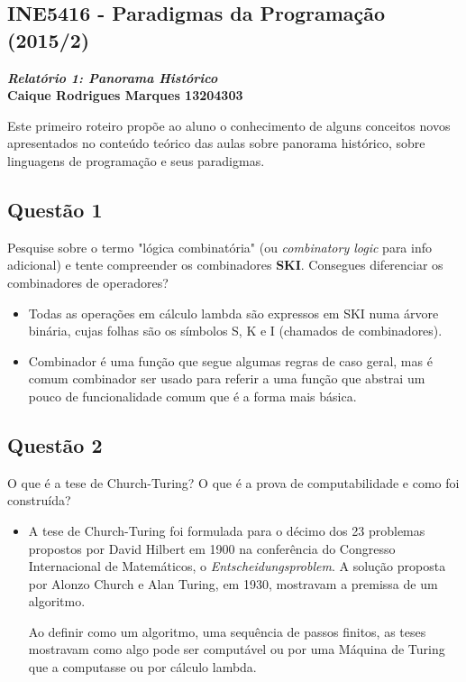 \documentclass{article}
\begin{document}
\begin{center}
    \section*{INE5416 - Paradigmas da Programação (2015/2)}
    \textbf{\textit{Relatório 1: Panorama Histórico} \\
    Caique Rodrigues Marques 13204303}
\end{center}
Este primeiro roteiro propõe ao aluno o conhecimento de alguns conceitos novos apresentados no conteúdo teórico das aulas sobre panorama histórico, sobre linguagens de programação e seus paradigmas.
\subsection*{Questão 1}
Pesquise sobre o termo "lógica combinatória" (ou \textit{combinatory logic} para info adicional) e tente compreender os combinadores \textbf{SKI}. Consegues diferenciar os combinadores de operadores?
        \begin{itemize}
        \item Todas as operações em cálculo lambda são expressos em SKI numa árvore binária, cujas folhas são os símbolos S, K e I (chamados de combinadores).
        \end{itemize}
        
        \begin{itemize}
        \item Combinador é uma função que segue algumas regras de caso geral, mas é comum combinador ser usado para referir a uma função que abstrai um pouco de funcionalidade comum que é a forma mais básica.
        \end{itemize}

\subsection*{Questão 2} 
O que é a tese de Church-Turing? O que é a prova de computabilidade e como foi construída?
        \begin{itemize}
        \item A tese de Church-Turing foi formulada para o décimo dos 23 problemas propostos por David Hilbert em 1900 na conferência do Congresso Internacional de Matemáticos, o \textit{Entscheidungsproblem}. A solução proposta por Alonzo Church e Alan Turing, em 1930, mostravam a premissa de um algoritmo. \par

Ao definir como um algoritmo, uma sequência de passos finitos, as teses mostravam como algo pode ser computável ou por uma Máquina de Turing que a computasse ou por cálculo lambda.
        \end{itemize}
\end{document}
